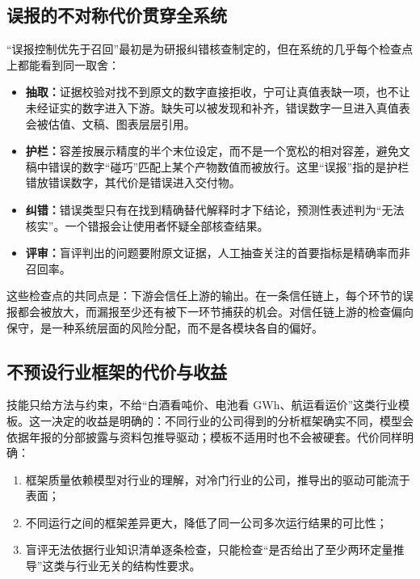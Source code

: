 \subsection{误报的不对称代价贯穿全系统}
\label{sec:disc-fp}

“误报控制优先于召回”最初是为研报纠错核查制定的，但在系统的几乎每个检查点上都能看到同一取舍：

\begin{itemize}
  \item \textbf{抽取：}证据校验对找不到原文的数字直接拒收，宁可让真值表缺一项，也不让未经证实的数字进入下游。缺失可以被发现和补齐，错误数字一旦进入真值表会被估值、文稿、图表层层引用。
  \item \textbf{护栏：}容差按展示精度的半个末位设定，而不是一个宽松的相对容差，避免文稿中错误的数字“碰巧”匹配上某个产物数值而被放行。这里“误报”指的是护栏错放错误数字，其代价是错误进入交付物。
  \item \textbf{纠错：}错误类型只有在找到精确替代解释时才下结论，预测性表述判为“无法核实”。一个错报会让使用者怀疑全部核查结果。
  \item \textbf{评审：}盲评判出的问题要附原文证据，人工抽查关注的首要指标是精确率而非召回率。
\end{itemize}

这些检查点的共同点是：下游会信任上游的输出。在一条信任链上，每个环节的误报都会被放大，而漏报至少还有被下一环节捕获的机会。对信任链上游的检查偏向保守，是一种系统层面的风险分配，而不是各模块各自的偏好。

\subsection{不预设行业框架的代价与收益}
\label{sec:disc-noframework}

技能只给方法与约束，不给“白酒看吨价、电池看 GWh、航运看运价”这类行业模板。这一决定的收益是明确的：不同行业的公司得到的分析框架确实不同，模型会依据年报的分部披露与资料包推导驱动；模板不适用时也不会被硬套。代价同样明确：

\begin{enumerate}
  \item 框架质量依赖模型对行业的理解，对冷门行业的公司，推导出的驱动可能流于表面；
  \item 不同运行之间的框架差异更大，降低了同一公司多次运行结果的可比性；
  \item 盲评无法依据行业知识清单逐条检查，只能检查“是否给出了至少两环定量推导”这类与行业无关的结构性要求。
\end{enumerate}

